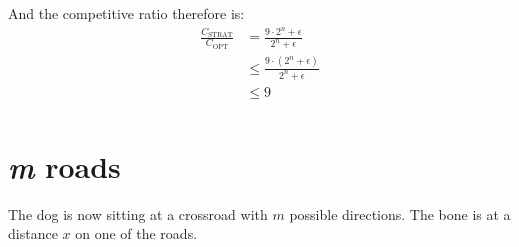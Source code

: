 And the competitive ratio therefore is:
\[
\begin{array}{ll}
  \frac{C_\text{STRAT}}{C_\text{OPT}}
    & = \frac{9 \cdot 2^n + \epsilon}{2^n + \epsilon}\\
    & \leq \frac{9 \cdot (2^n + \epsilon)}{2^n + \epsilon}\\
    & \leq 9\\
\end{array}
\]


\section{\textit{m} roads}

The dog is now sitting at a crossroad with $m$ possible directions. The bone is at a distance $x$ on one of the roads.
